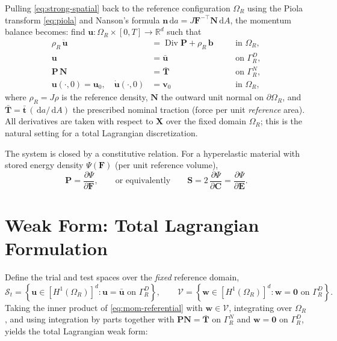 \documentclass[11pt]{article}
\newcommand{\ud}{\,\mathrm{d}}
\newcommand{\Dive}{\operatorname{Div}}      %
\newcommand{\bX}{\bm{X}}
\newcommand{\bu}{\bm{u}}
\newcommand{\bv}{\bm{v}}
\newcommand{\bb}{\bm{b}}
\newcommand{\bn}{\bm{n}}
\newcommand{\bN}{\bm{N}}
\newcommand{\bt}{\bm{t}}
\newcommand{\bT}{\bm{T}}
\newcommand{\bw}{\bm{w}}
\newcommand{\bP}{\bm{P}}
\newcommand{\bS}{\bm{S}}
\newcommand{\bF}{\bm{F}}
\newcommand{\bC}{\bm{C}}
\newcommand{\bE}{\bm{E}}
\begin{document}
Pulling \eqref{eq:strong-spatial} back to the reference configuration
$\Omega_R$ using the Piola transform \eqref{eq:piola} and Nanson's formula
$\bn \ud a = J\bF^{-\top}\bN \ud A$, the momentum balance becomes: find
$\bu : \Omega_R \times [0,T] \to \mathbb{R}^d$ such that
\begin{subequations}
\label{eq:strong-referential}
\begin{alignat}{2}
  \rho_R\, \ddot{\bu} &= \Dive \bP + \rho_R\, \bb
      &\quad& \text{in } \Omega_R, \label{eq:mom-referential}\\
  \bu &= \bar{\bu} && \text{on } \Gamma_R^D, \\
  \bP\,\bN &= \bar{\bT} && \text{on } \Gamma_R^N, \\
  \bu(\cdot,0) = \bu_0, \quad \dot{\bu}(\cdot,0) &= \bv_0 && \text{in } \Omega_R,
\end{alignat}
\end{subequations}
where $\rho_R = J\rho$ is the reference density, $\bN$ the outward unit
normal on $\partial\Omega_R$, and $\bar{\bT} = \bar{\bt}\,(\ud a/\ud A)$ the
prescribed nominal traction (force per unit \emph{reference} area).  All
derivatives are taken with respect to $\bX$ over the fixed domain $\Omega_R$;
this is the natural setting for a total Lagrangian discretization.

The system is closed by a constitutive relation.  For a hyperelastic material
with stored energy density $\Psi(\bF)$ (per unit reference volume),
\begin{equation}
  \bP = \frac{\partial \Psi}{\partial \bF},
  \qquad\text{or equivalently}\qquad
  \bS = 2\,\frac{\partial \Psi}{\partial \bC}
      = \frac{\partial \Psi}{\partial \bE}.
\end{equation}

\section{Weak Form: Total Lagrangian Formulation}

Define the trial and test spaces over the \emph{fixed} reference domain,
\begin{equation}
  \mathcal{S}_t = \left\{ \bu \in [H^1(\Omega_R)]^d :
      \bu = \bar{\bu} \text{ on } \Gamma_R^D \right\},
  \qquad
  \mathcal{V} = \left\{ \bw \in [H^1(\Omega_R)]^d :
      \bw = \bm{0} \text{ on } \Gamma_R^D \right\}.
\end{equation}
Taking the inner product of \eqref{eq:mom-referential} with
$\bw \in \mathcal{V}$, integrating over $\Omega_R$, and using integration by
parts together with $\bP\bN = \bar{\bT}$ on $\Gamma_R^N$ and $\bw = \bm{0}$
on $\Gamma_R^D$, yields the total Lagrangian weak form:
\end{document}

